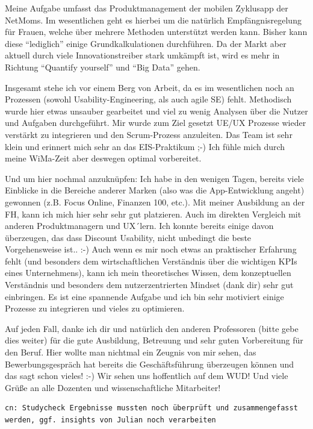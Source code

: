 Meine Aufgabe umfasst das Produktmanagement der mobilen Zyklusapp der
NetMoms. Im wesentlichen geht es hierbei um die natürlich
Empfängnisregelung für Frauen, welche über mehrere Methoden unterstützt
werden kann. Bisher kann diese ``lediglich'' einige Grundkalkulationen
durchführen. Da der Markt aber aktuell durch viele Innovationstreiber
stark umkämpft ist, wird es mehr in Richtung ``Quantify yourself'' und
``Big Data'' gehen.

Insgesamt stehe ich vor einem Berg von Arbeit, da es im wesentlichen
noch an Prozessen (sowohl Usability-Engineering, als auch agile SE)
fehlt. Methodisch wurde hier etwas unsauber gearbeitet und viel zu wenig
Analysen über die Nutzer und Aufgaben durchgeführt. Mir wurde zum Ziel
gesetzt UE/UX Prozesse wieder verstärkt zu integrieren und den
Scrum-Prozess anzuleiten. Das Team ist sehr klein und erinnert mich sehr
an das EIS-Praktikum ;-) Ich fühle mich durch meine WiMa-Zeit aber
deswegen optimal vorbereitet.

Und um hier nochmal anzuknüpfen: Ich habe in den wenigen Tagen, bereits
viele Einblicke in die Bereiche anderer Marken (also was die
App-Entwicklung angeht) gewonnen (z.B. Focus Online, Finanzen 100,
etc.). Mit meiner Ausbildung an der FH, kann ich mich hier sehr sehr gut
platzieren. Auch im direkten Vergleich mit anderen Produktmanagern und
UX´lern. Ich konnte bereits einige davon überzeugen, das dass Discount
Usability, nicht unbedingt die beste Vorgehensweise ist.. :-) Auch wenn
es mir noch etwas an praktischer Erfahrung fehlt (und besonders dem
wirtschaftlichen Verständnis über die wichtigen KPIs eines
Unternehmens), kann ich mein theoretisches Wissen, dem konzeptuellen
Verständnis und besonders dem nutzerzentrierten Mindset (dank dir) sehr
gut einbringen. Es ist eine spannende Aufgabe und ich bin sehr motiviert
einige Prozesse zu integrieren und vieles zu optimieren.

Auf jeden Fall, danke ich dir und natürlich den anderen Professoren
(bitte gebe dies weiter) für die gute Ausbildung, Betreuung und sehr
guten Vorbereitung für den Beruf. Hier wollte man nichtmal ein Zeugnis
von mir sehen, das Bewerbungsgespräch hat bereits die Geschäftsführung
überzeugen können und das sagt schon vieles! :-) Wir sehen uns
hoffentlich auf dem WUD! Und viele Grüße an alle Dozenten und
wissenschaftliche Mitarbeiter!

\begin{verbatim}
cn: Studycheck Ergebnisse mussten noch überprüft und zusammengefasst werden, ggf. insights von Julian noch verarbeiten
\end{verbatim}

